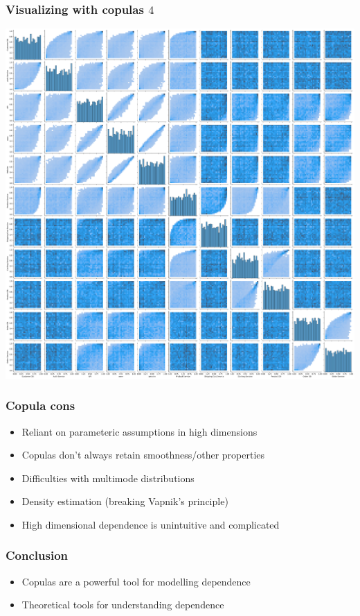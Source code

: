\documentclass[18pt,aspectratio=149]{beamer}
\begin{document}
\begin{frame}
    \frametitle{Visualizing with copulas $4$}
    \begin{center}
        \includegraphics[height=0.8\textheight]{psuedocopulapairplot.png}
    \end{center}
\end{frame}


\begin{frame}
    \frametitle{Copula cons}
    \begin{itemize}
        \item Reliant on parameteric assumptions in high dimensions
        \item Copulas don't always retain smoothness/other properties
        \item Difficulties with multimode distributions
        \item Density estimation (breaking Vapnik's principle)
        \item High dimensional dependence is unintuitive and complicated
    \end{itemize}
\end{frame}



\begin{frame}
    \frametitle{Conclusion}
    \begin{itemize}
        \item Copulas are a powerful tool for modelling dependence
        \item Theoretical tools for understanding dependence
    \end{itemize}
\end{frame}
\end{document}
